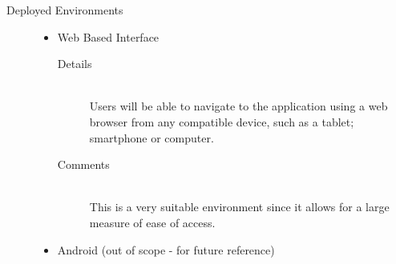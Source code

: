 \documentclass[10pt]{article}
\begin{document}
\begin{description}
\begin{itemize}
\begin{description}
					\end{description}
			\end{itemize}	
		\item[Deployed Environments] \hfill 
			\begin{itemize}
				\item Web Based Interface
					\begin{description}
						\item[Details] \hfill \\
							Users will be able to navigate to the application using a web browser from any compatible device, such as a tablet; smartphone or computer.
						\item[Comments]\hfill \\
							This is a very suitable environment since it allows for a large measure of ease of access.
					\end{description}
				\item Android (out of scope - for future reference)

			\end{itemize}
\end{description}	
\end{document}
